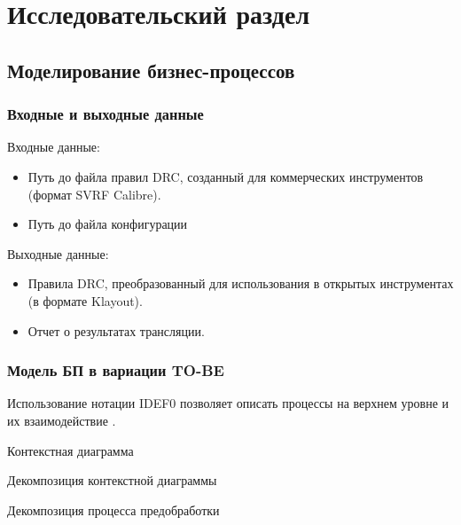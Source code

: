 \chapter{Исследовательский раздел}

\section{Моделирование бизнес-процессов}

\subsection{Входные и выходные данные}

Входные данные:

\begin{itemize}
	\item Путь до файла правил DRC,
		созданный для коммерческих инструментов (формат SVRF Calibre).
	\item Путь до файла конфигурации
\end{itemize}

Выходные данные:

\begin{itemize}
	\item Правила DRC, преобразованный для использования
		в открытых инструментах (в формате Klayout).
	\item Отчет о результатах трансляции.
\end{itemize}

\subsection{Модель БП в вариации TO-BE}

Использование нотации IDEF0 позволяет описать процессы на верхнем уровне
и их взаимодействие .

\begin{image}
	\caption{Контекстная диаграмма}
	\label{fig:idef0}
\end{image}

\begin{image}
	\caption{Декомпозиция контекстной диаграммы}
	\label{fig:idef0:a0}
\end{image}

\begin{image}
	\caption{Декомпозиция процесса предобработки}
	\label{fig:idef0:a3}
\end{image}

